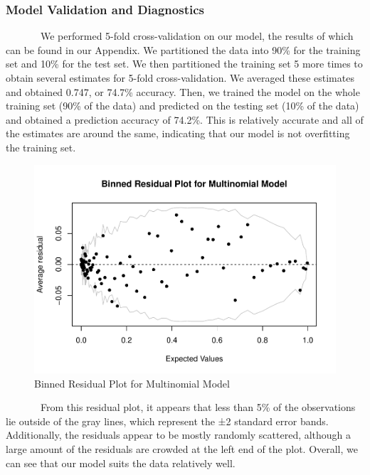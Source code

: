 \documentclass[
]{article}
\begin{document}
\hypertarget{model-validation-and-diagnostics}{%
\subsubsection{Model Validation and
Diagnostics}\label{model-validation-and-diagnostics}}

~~~~~~~We performed 5-fold cross-validation on our model, the results of
which can be found in our Appendix. We partitioned the data into 90\%
for the training set and 10\% for the test set. We then partitioned the
training set 5 more times to obtain several estimates for 5-fold
cross-validation. We averaged these estimates and obtained 0.747, or
74.7\% accuracy. Then, we trained the model on the whole training set
(90\% of the data) and predicted on the testing set (10\% of the data)
and obtained a prediction accuracy of 74.2\%. This is relatively
accurate and all of the estimates are around the same, indicating that
our model is not overfitting the training set.

\begin{figure}

{\centering \includegraphics[width=0.8\linewidth]{write-up_files/figure-latex/unnamed-chunk-7-1} 

}

\caption{Binned Residual Plot for Multinomial Model}\label{fig:unnamed-chunk-7}
\end{figure}

~~~~~~~From this residual plot, it appears that less than 5\% of the
observations lie outside of the gray lines, which represent the ±2
standard error bands. Additionally, the residuals appear to be mostly
randomly scattered, although a large amount of the residuals are crowded
at the left end of the plot. Overall, we can see that our model suits
the data relatively well.
\end{document}
